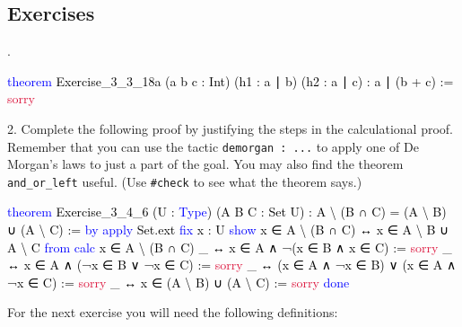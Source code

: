 \documentclass[
  letterpaper,
  DIV=11,
  numbers=noendperiod]{scrreprt}
\newenvironment{Shaded}{\begin{snugshade}}{\end{snugshade}}
\newcommand{\ConstantTok}[1]{\textcolor[rgb]{0.56,0.35,0.01}{#1}}
\newcommand{\KeywordTok}[1]{\textcolor[rgb]{0.00,0.23,0.31}{#1}}
\newcommand{\NormalTok}[1]{\textcolor[rgb]{0.00,0.23,0.31}{#1}}
\renewcommand{\NormalTok}[1]{\textcolor[HTML]{000000}{#1}}
\renewcommand{\KeywordTok}[1]{\textcolor[HTML]{0000FF}{#1}}
\renewcommand{\ConstantTok}[1]{\textcolor[HTML]{DC143C}{#1}}
\newcommand{\nobreakShaded}{\renewenvironment{Shaded}
	{\begin{tcolorbox}[frame hidden, enhanced, interior hidden, boxrule=0pt,
		borderline west={3pt}{0pt}{shadecolor}, sharp corners]}
	{\end{tcolorbox}}}
\newenvironment{numex}[1]
	{\begin{minipage}[t]{0.04\textwidth}\vspace{8pt}{#1}.
		\end{minipage}\nobreakShaded\begin{minipage}[t]{0.96\textwidth}\vspace{0pt}}
	{\end{minipage}}
\newenvironment{mdsk}
	{\medskip}
	{}
\theoremstyle{remark}
\begin{document}
\hypertarget{exercises-5}{%
\subsection{Exercises}\label{exercises-5}}

\begin{numex}{1}

\begin{Shaded}
\begin{Highlighting}[]
\KeywordTok{theorem}\NormalTok{ Exercise\_3\_3\_18a (a b c : Int)}
\NormalTok{    (h1 : a ∣ b) (h2 : a ∣ c) : a ∣ (b + c) := }\ConstantTok{sorry}
\end{Highlighting}
\end{Shaded}

\end{numex}

2. Complete the following proof by justifying the steps in the
calculational proof. Remember that you can use the tactic
\texttt{demorgan\ :\ ...} to apply one of De Morgan's laws to just a
part of the goal. You may also find the theorem \texttt{and\_or\_left}
useful. (Use \texttt{\#check} to see what the theorem says.)

\begin{Shaded}
\begin{Highlighting}[]
\KeywordTok{theorem}\NormalTok{ Exercise\_3\_4\_6 (U : }\KeywordTok{Type}\NormalTok{) (A B C : Set U) :}
\NormalTok{    A \textbackslash{} (B ∩ C) = (A \textbackslash{} B) ∪ (A \textbackslash{} C) := }\KeywordTok{by}
  \KeywordTok{apply}\NormalTok{ Set.ext}
  \KeywordTok{fix}\NormalTok{ x : U}
  \KeywordTok{show}\NormalTok{ x ∈ A \textbackslash{} (B ∩ C) ↔ x ∈ A \textbackslash{} B ∪ A \textbackslash{} C }\KeywordTok{from}
    \KeywordTok{calc}\NormalTok{ x ∈ A \textbackslash{} (B ∩ C)}
\NormalTok{      \_ ↔ x ∈ A ∧ ¬(x ∈ B ∧ x ∈ C) := }\ConstantTok{sorry}
\NormalTok{      \_ ↔ x ∈ A ∧ (¬x ∈ B ∨ ¬x ∈ C) := }\ConstantTok{sorry}  
\NormalTok{      \_ ↔ (x ∈ A ∧ ¬x ∈ B) ∨ (x ∈ A ∧ ¬x ∈ C) := }\ConstantTok{sorry}
\NormalTok{      \_ ↔ x ∈ (A \textbackslash{} B) ∪ (A \textbackslash{} C) := }\ConstantTok{sorry}
  \KeywordTok{done}
\end{Highlighting}
\end{Shaded}

\begin{mdsk}

\end{mdsk}

For the next exercise you will need the following definitions:
\end{document}
